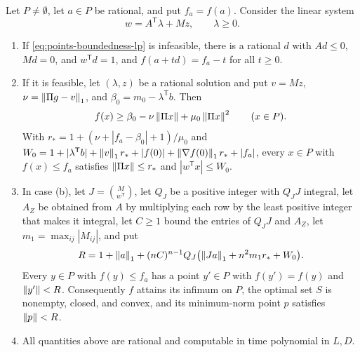 \begin{lemma}\label{lem:points-radius}
Let $P\ne\emptyset$, let $a\in P$ be rational, and put $f_a=f(a)$. Consider
the linear system
\begin{equation}\label{eq:points-boundedness-lp}
 w=A^{\mathsf T}\lambda+Mz,\qquad\lambda\ge0 .
\end{equation}
\begin{enumerate}[label=(\alph*)]
\item If \eqref{eq:points-boundedness-lp} is infeasible, there is a
rational $d$ with $Ad\le0$, $Md=0$, and $w^{\mathsf T}d=1$, and
$f(a+td)=f_a-t$ for all $t\ge0$.
\item If it is feasible, let $(\lambda,z)$ be a rational solution and put
$v=Mz$, $\nu=\left\lVert\Pi g-v\right\rVert_1$, and $\beta_0=m_0-\lambda^{\mathsf T}b$.
Then
\begin{equation}\label{eq:points-quotient}
 f(x)\ge\beta_0-\nu\left\lVert\Pi x\right\rVert+\mu_0\left\lVert\Pi x\right\rVert^2\qquad(x\in P).
\end{equation}
With $r_*=1+(\nu+|f_a-\beta_0|+1)/\mu_0$ and
$W_0=1+|\lambda^{\mathsf T}b|+\left\lVert v\right\rVert_1r_*+|f(0)|+\left\lVert\nabla f(0)\right\rVert_1r_*+
|f_a|$, every $x\in P$ with $f(x)\le f_a$ satisfies $\left\lVert\Pi x\right\rVert\le r_*$
and $|w^{\mathsf T}x|\le W_0$.
\item In case (b), let $J=\binom{M}{w^{\mathsf T}}$, let $Q_J$ be a
positive integer with $Q_JJ$ integral, let $A_Z$ be obtained from $A$ by
multiplying each row by the least positive integer that makes it integral,
let $C\ge1$ bound the entries of $Q_JJ$ and $A_Z$, let
$m_1=\max_{ij}|M_{ij}|$, and put
\[
 R=1+\left\lVert a\right\rVert_1+(nC)^{n-1}Q_J\bigl(\left\lVert Ja\right\rVert_1+n^2m_1r_*+W_0\bigr).
\]
Every $y\in P$ with $f(y)\le f_a$ has a point $y'\in P$ with $f(y')=f(y)$
and $\left\lVert y'\right\rVert<R$. Consequently $f$ attains its infimum on $P$, the optimal
set $S$ is nonempty, closed, and convex, and its minimum-norm point $p$
satisfies $\left\lVert p\right\rVert<R$.
\item All quantities above are rational and computable in time polynomial
in $L,D$.
\end{enumerate}
\end{lemma}

